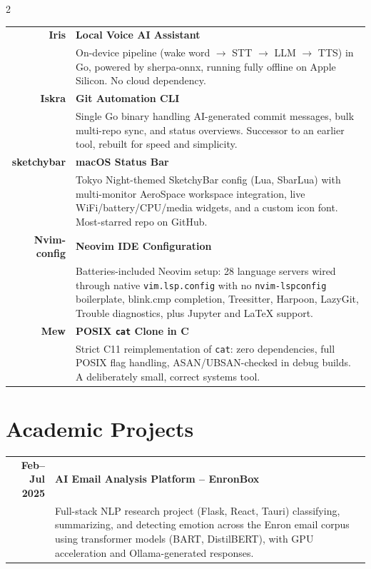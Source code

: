 \documentclass[lighthipster]{simplehipstercv}
\begin{document}
\begin{paracol}{2}
\begin{tabular}{r| p{}}
    \textbf{Iris} & \textbf{Local Voice AI Assistant} \\
    & {\footnotesize On-device pipeline (wake word $\to$ STT $\to$ LLM $\to$ TTS) in Go, powered by sherpa-onnx, running fully offline on Apple Silicon. No cloud dependency.} \\[0.8em]

    \textbf{Iskra} & \textbf{Git Automation CLI} \\
    & {\footnotesize Single Go binary handling AI-generated commit messages, bulk multi-repo sync, and status overviews. Successor to an earlier tool, rebuilt for speed and simplicity.} \\[0.8em]

    \textbf{sketchybar} & \textbf{macOS Status Bar} \\
    & {\footnotesize Tokyo Night-themed SketchyBar config (Lua, SbarLua) with multi-monitor AeroSpace workspace integration, live WiFi/battery/CPU/media widgets, and a custom icon font. Most-starred repo on GitHub.} \\[0.8em]

    \textbf{Nvim-config} & \textbf{Neovim IDE Configuration} \\
    & {\footnotesize Batteries-included Neovim setup: 28 language servers wired through native \texttt{vim.lsp.config} with no \texttt{nvim-lspconfig} boilerplate, blink.cmp completion, Treesitter, Harpoon, LazyGit, Trouble diagnostics, plus Jupyter and LaTeX support.} \\[0.8em]

    \textbf{Mew} & \textbf{POSIX \texttt{cat} Clone in C} \\
    & {\footnotesize Strict C11 reimplementation of \texttt{cat}: zero dependencies, full POSIX flag handling, ASAN/UBSAN-checked in debug builds. A deliberately small, correct systems tool.} \\
\end{tabular}

\vspace{1.2em}

\section*{Academic Projects}

\begin{tabular}{r| p{}}
    \textbf{Feb--Jul 2025} & \textbf{AI Email Analysis Platform -- EnronBox} \\
    & {\footnotesize Full-stack NLP research project (Flask, React, Tauri) classifying, summarizing, and detecting emotion across the Enron email corpus using transformer models (BART, DistilBERT), with GPU acceleration and Ollama-generated responses.} \\[0.7em]


\end{tabular}
\end{paracol}
\end{document}
